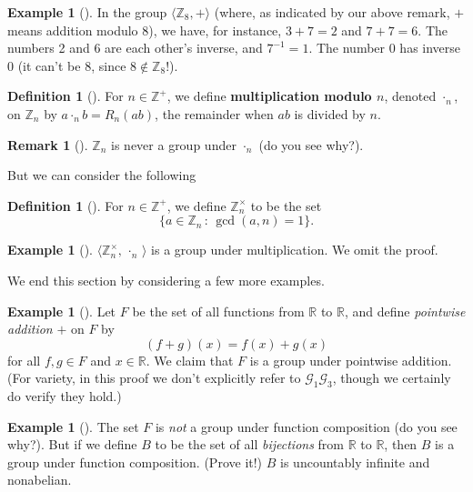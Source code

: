 \documentclass[10pt,]{book}
\newcommand{\terminology}[1]{\textbf{#1}}
\theoremstyle{plain}
\theoremstyle{definition}
\newtheorem{definition}[theorem]{Definition}
\theoremstyle{definition}
\newtheorem{remark}[theorem]{Remark}
\theoremstyle{definition}
\newtheorem{example}[theorem]{Example}
\theoremstyle{definition}
\numberwithin{equation}{section}
\def\Z{\mathbb{Z}}
\def\R{\mathbb{R}}
\def\G{\mathcal{G}}
\begin{document}
\begin{example}[]\label{example-19}
In the group \(\langle \Z_8,+\rangle\) (where, as indicated by our above remark, \(+\) means addition modulo \(8\)), we have, for instance, \(3+7=2\) and \(7+7=6\). The numbers 2 and 6 are each other's inverse, and \(7^{-1}=1\). The number \(0\) has inverse \(0\) (it can't be \(8\), since \(8\not\in \Z_8\)!).%
\end{example}
\begin{definition}[{}]\label{definition-28}
For \(n\in \Z^+\), we define \terminology{multiplication modulo \(n\)}, denoted \(\cdot_n\), on \(\Z_n\) by \(a\cdot_n b = R_n(ab)\), the remainder when \(ab\) is divided by \(n\).%
\end{definition}
\begin{remark}[]\label{remark-15}
\(\Z_n\) is never a group under \(\cdot_n\) (do you see why?).%
\end{remark}
But we can consider the following%
\begin{definition}[{}]\label{definition-29}
\label{notation-43}
For \(n\in \Z^+\), we define \(\Z_n^{\times}\) to be the set%
\begin{equation*}
\{a\in \Z_n\,:\,\gcd(a,n)=1\}\text{.}
\end{equation*}
%
\end{definition}
\begin{example}[]\label{example-20}
\(\langle \Z_n^{\times},\,\cdot_n\, \rangle\) is a group under multiplication. We omit the proof.%
\end{example}
We end this section by considering a few more examples.%
\begin{example}[]\label{funcrr}
\label{notation-44}
 Let \(F\) be the set of all functions from \(\R\) to \(\R\), and define \emph{pointwise addition} \(+\) on \(F\) by%
\begin{equation*}
(f+g)(x)=f(x)+g(x)
\end{equation*}
for all \(f,g\in F\) and \(x\in \R\). We claim that \(F\) is a group under pointwise addition. (For variety, in this proof we don't explicitly refer to \(\G_1\)\textendash{}\(\G_3\), though we certainly do verify they hold.)%
\end{example}
\begin{example}[]\label{bijrr}
\label{notation-45}
 The set \(F\) is \emph{not} a group under function composition (do you see why?). But if we define \(B\) to be the set of all \emph{bijections} from \(\R\) to \(\R\), then \(B\) is a group under function composition. (Prove it!) \(B\) is uncountably infinite and nonabelian.%
\end{example}
\end{document}

